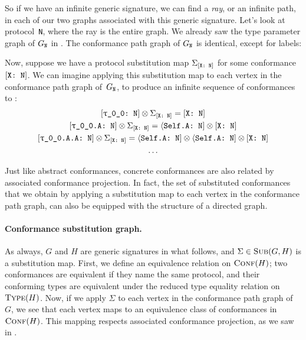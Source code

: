 \documentclass[../generics]{subfiles}
\begin{document}
So if we have an infinite generic signature, we can find a \emph{ray}, or an infinite path, in each of our two graphs associated with this generic signature. Let's look at protocol~\texttt{N}, where the ray is the entire graph. We already saw the type parameter graph of $G_{\texttt{N}}$ in . The conformance path graph of $G_{\texttt{N}}$ is identical, except for labels:
\begin{center}
\end{center}

Now, suppose we have a protocol substitution map $\Sigma_{[\texttt{X:~N}]}$ for some conformance $[\texttt{X:~N}]$. We can imagine applying this substitution map to each vertex in the conformance path graph of~$G_{\texttt{N}}$, to produce an infinite sequence of conformances to \tN:
\begin{gather*}
\ConfReq{\rT}{N}\otimes\Sigma_{\XN}=\XN\\
\ConfReq{\rT.A}{N}\otimes\Sigma_{\XN}=\SelfAToN\otimes\XN\\
\ConfReq{\rT.A.A}{N}\otimes\Sigma_{\XN}=\SelfAToN\otimes\SelfAToN\otimes\XN\\
\ldots
\end{gather*}

Just like abstract conformances, concrete conformances are also related by associated conformance projection. In fact, the set of substituted conformances that we obtain by applying a substitution map to each vertex in the conformance path graph, can also be equipped with the structure of a directed graph.

\paragraph{Conformance substitution graph.}
As always, $G$ and $H$ are generic signatures in what follows, and $\Sigma\in\textsc{Sub}({G, H})$ is a substitution map. First, we define an equivalence relation on $\textsc{Conf}({H})$; two conformances are equivalent if they name the same protocol, and their conforming types are equivalent under the reduced type equality relation on $\textsc{Type}({H})$. Now, if we apply $\Sigma$ to each vertex in the conformance path graph of $G$, we see that each vertex maps to an equivalence class of conformances in $\textsc{Conf}({H})$. This mapping respects associated conformance projection, as we saw in .
\end{document}
